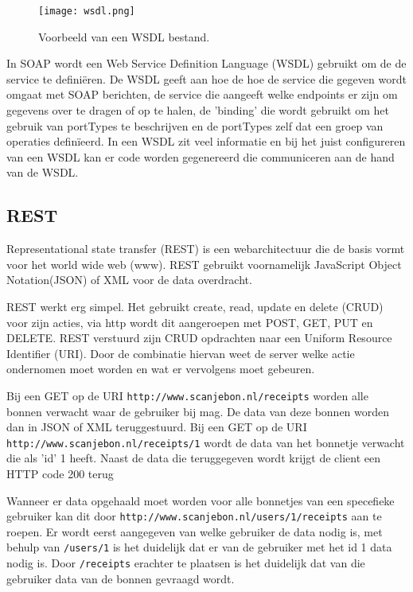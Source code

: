 \documentclass[a4paper,11pt,oneside]{report}
\begin{document}
\begin{wrapfigure}{r}{0.5\textwidth}
  \texttt{[image: wsdl.png]}
  \caption{Voorbeeld van een WSDL bestand.}
\end{wrapfigure}
In SOAP wordt een Web Service Definition Language (WSDL) gebruikt om de de
service te defini\"eren. De WSDL geeft aan hoe de hoe de service die gegeven
wordt omgaat met SOAP berichten, de service die aangeeft welke endpoints er zijn
om gegevens over te dragen of op te halen, de 'binding' die wordt gebruikt om
het gebruik van portTypes te beschrijven en de portTypes zelf dat een groep van
operaties defin\"ieerd. In een WSDL zit veel informatie en bij het juist
configureren van een WSDL kan er code worden gegenereerd die communiceren aan de
hand van de WSDL.

\subsection{REST}
Representational state transfer (REST) is een webarchitectuur die de basis vormt
voor het world wide web (www). REST gebruikt voornamelijk JavaScript Object
Notation(JSON) of XML voor de data overdracht.

REST werkt erg simpel. Het gebruikt create, read, update en delete (CRUD) voor
zijn acties, via http wordt dit aangeroepen met POST, GET, PUT en DELETE. REST
verstuurd zijn CRUD opdrachten naar een Uniform Resource Identifier (URI). Door
de combinatie hiervan weet de server welke actie ondernomen moet worden en wat
er vervolgens moet gebeuren.
\newline

Bij een GET op de URI
\lstinline[style=code-block]|http://www.scanjebon.nl/receipts|
worden alle bonnen verwacht waar de gebruiker bij mag. De data van deze bonnen
worden dan in JSON of XML teruggestuurd. Bij een GET op de URI
\lstinline[style=code-block]|http://www.scanjebon.nl/receipts/1|
wordt de data van het bonnetje verwacht die als 'id' 1 heeft. Naast de data die
teruggegeven wordt krijgt de client een HTTP code 200 terug

Wanneer er data opgehaald moet worden voor alle bonnetjes van een specefieke
gebruiker kan dit door
\lstinline[style=code-block]|http://www.scanjebon.nl/users/1/receipts| aan te
roepen.
Er wordt eerst aangegeven van welke gebruiker de data nodig is, met behulp van
\lstinline[style=code-block]|/users/1| is het duidelijk
dat er van de gebruiker met het id 1 data nodig is. Door
\lstinline[style=code-block]|/receipts| erachter te
plaatsen is het duidelijk dat van die gebruiker data van de bonnen gevraagd
wordt.
\end{document}
